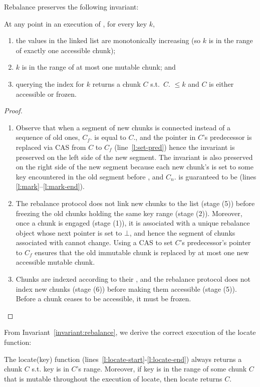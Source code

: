 Rebalance preserves the following invariant:
\begin{invariant}
At any point in an execution of \kiwi, for every key $k$,  
\begin{enumerate}
\item the  values in the linked list are monotonically increasing (so $k$ is in the range of exactly one accessible chunk);  
\item  $k$ is in the range of at most one mutable chunk; and 
\item querying the index for $k$  returns a chunk $C$ s.t.\  $C$. $\le k$ and $C$ is either accessible or frozen.
\end{enumerate}
\label{invariant:rebalance}
\end{invariant}
\begin{proof}
\begin{enumerate}
\item
Observe that when a segment of new chunks is connected instead of a sequence of old ones, $C_f$. is equal to $C$., 
and  the  pointer in $C$'s predecessor is replaced via CAS from $C$ to $C_f$ (line~\ref{l:set-pred}) hence the invariant is preserved on the left side of the new segment.
The invariant is also preserved on the right side of the new segment because each new chunk's  is set to some key encountered in the old segment before , 
and $C_n$. is guaranteed to be  (lines  \ref{l:mark}--\ref{l:mark-end}).  
\item
The rebalance protocol does not link new chunks to the list (stage (5)) 
before freezing the old chunks holding the same key range (stage (2)).
Moreover, once a chunk is engaged (stage (1)), it is associated with a unique rebalance object 
whose next pointer is set to $\bot$, 
and hence the segment of chunks associated with  cannot change. 
Using a CAS to set $C$'s predecessor's  pointer to $C_f$ ensures 
that the old immutable chunk is replaced by at most one new accessible mutable chunk.
\item
Chunks are indexed according to their , and 
the rebalance protocol does not index new chunks (stage (6)) before making them accessible (stage (5)). 
Before a chunk ceases to be accessible, it must be frozen. 
\end{enumerate}
\end{proof}

From Invariant~\ref{invariant:rebalance}, we derive the correct execution of the locate function:
\begin{corollary}\label{corollary:locate}
The locate(key) function  (lines~\ref{l:locate-start}-\ref{l:locate-end}) always returns a chunk $C$ s.t. key is in $C$'s range.
Moreover, if key is in the range of some chunk $C$ that is mutable throughout the execution of locate, then locate returns $C$.
\end{corollary}

